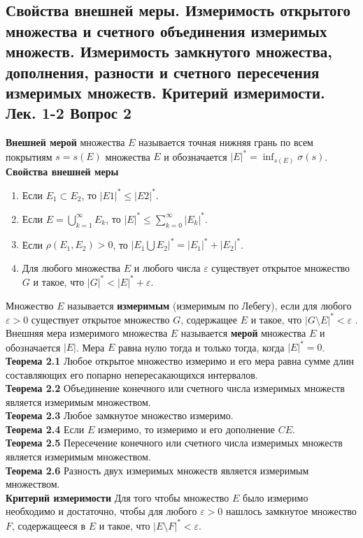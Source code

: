 \documentclass{article}
\begin{document}
\subsection{Свойства внешней меры. Измеримость открытого множества и счетного объединения измеримых множеств. Измеримость замкнутого множества, дополнения, разности и счетного пересечения измеримых множеств. Критерий измеримости. Лек. 1-2 \textbf{Вопрос 2}}
	\textbf{Внешней мерой} множества $E$ называется точная нижняя грань по всем покрытиям $s=s(E)$ множества $E$ и обозначается ${|E|}^{*}=\inf _{s(E)} \sigma(s)$.\\
	\textbf{Свойства внешней меры}
	\begin{enumerate}
		\item Если ${E}_{1} \subset {E}_{2}$, то ${|E1|}^{*} \leq {|E2|}^{*}$.
		\item Если $E=\bigcup_{k=1}^{\infty} E_{k}$, то ${|E|}^{*} \leq \sum_{k=0}^{\infty} {|{E}_{k}|}^{*}$.
		\item Если $\rho ({E}_{1},{E}_{2})>0$, то ${|{E}_{1} \bigcup {E}_{2}|}^{*}={|{E}_{1}|}^{*}+{|{E}_{2}|}^{*}$.
		\item Для любого множества $E$ и любого числа $\varepsilon$ существует открытое множество $G$
		и такое, что ${|G|}^{*}<{|E|}^{*}+ \varepsilon$.
	\end{enumerate}

	Множество $E$ называется \textbf{измеримым} (измеримым по Лебегу), если для любого $\varepsilon>0$ существует открытое множество $G$,  содержащее $E$ и такое, что  $|G \setminus E|^{*}<\varepsilon$ .  Внешняя мера измеримого множества $E$ называется \textbf{мерой} множества $E$ и обозначается $|E|$.
	Мера $E$ равна нулю тогда и только тогда, когда $|E|^{*}=0$.\\
	
	\textbf{Теорема 2.1} Любое открытое множество измеримо и его мера равна сумме длин составляющих его попарно непересакающихся интервалов.\\
	\textbf{Теорема 2.2} Объединение конечного или счетного числа измеримых множеств является измеримым множеством.\\
	\textbf{Теорема 2.3} Любое замкнутое множество измеримо.\\
	\textbf{Теорема 2.4} Если $E$ измеримо, то измеримо и его дополнение $CE$.\\
	\textbf{Теорема 2.5} Пересечение конечного или счетного числа измеримых множеств является измеримым множеством.\\
	\textbf{Теорема 2.6} Разность двух измеримых множеств является измеримым множеством.\\
	\textbf{Критерий измеримости} Для того чтобы множество $E$ было измеримо необходимо и достаточно, чтобы для любого $\varepsilon>0$ нашлось замкнутое множество $F$,  содержащееся в $E$ и такое, что  $|E \setminus F|^{*}<\varepsilon$.\\
\end{document}
